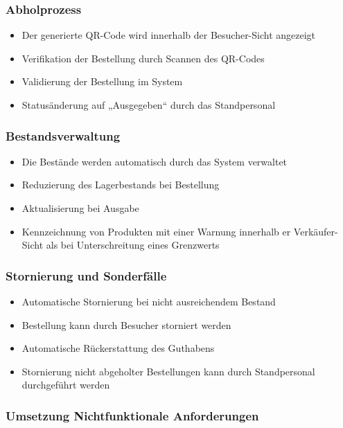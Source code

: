 \subsubsection*{Abholprozess}
\begin{itemize}
    \item Der generierte \acs{QR}-Code wird innerhalb der Besucher-Sicht angezeigt
    \item Verifikation der Bestellung durch Scannen des \acs{QR}-Codes
    \item Validierung der Bestellung im System
    \item Statusänderung auf „Ausgegeben“ durch das Standpersonal
\end{itemize}

\subsubsection*{Bestandsverwaltung}
\begin{itemize}
    \item Die Bestände werden automatisch durch das System verwaltet
    \item Reduzierung des Lagerbestands bei Bestellung
    \item Aktualisierung bei Ausgabe
    \item Kennzeichnung von Produkten mit einer Warnung innerhalb er Verkäufer-Sicht als bei Unterschreitung eines Grenzwerts
\end{itemize}

\subsubsection*{Stornierung und Sonderfälle}
\begin{itemize}
    \item Automatische Stornierung bei nicht ausreichendem Bestand
    \item Bestellung kann durch Besucher storniert werden
    \item Automatische Rückerstattung des Guthabens
    \item Stornierung nicht abgeholter Bestellungen kann durch Standpersonal durchgeführt werden
\end{itemize}

\subsubsection{Umsetzung Nichtfunktionale Anforderungen}
\label{sec:UmsetzungNichtfunktionaleAnforderungen}

